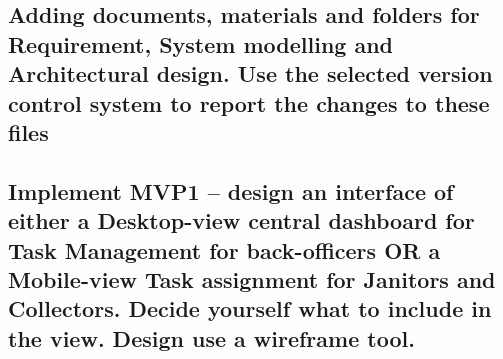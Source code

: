 \documentclass[a4paper]{article}
\begin{document}
\subsection{Adding documents, materials and folders for Requirement, System modelling and Architectural design. Use the selected version control system to report the changes to these files}
\subsection{Implement MVP1 – design an interface of either a Desktop-view central dashboard for Task Management for back-officers OR a Mobile-view Task assignment for Janitors and Collectors. Decide yourself what to include in  the view. Design use a wireframe tool. }
\end{document}
